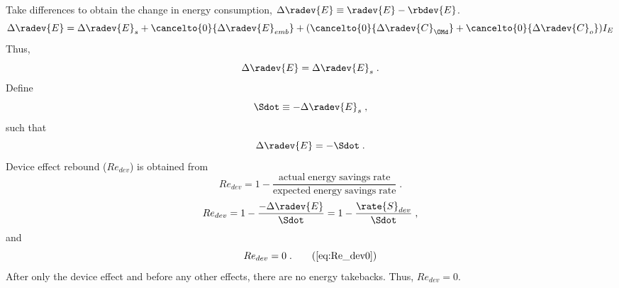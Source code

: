 \begin{landscape}
{Take differences to obtain the change in energy consumption, $\Delta \radev{E} \equiv \radev{E} - \rbdev{E}$.
%
\begin{equation}
  \Delta \radev{E} = \Delta \radev{E}_s
                     + \cancelto{0}{\Delta \radev{E}_{emb}} 
                     + (\cancelto{0}{\Delta \radev{C}_{\OMd}} 
                     + \cancelto{0}{\Delta \radev{C}_o}) I_E
\end{equation}
%
Thus, 
%
\begin{equation}
\Delta \radev{E} = \Delta \radev{E}_s \; .
\end{equation}
%
Define
%
\begin{equation} \label{eq:Sdot_def}
\Sdot \equiv -\Delta \radev{E}_s \; ,
\end{equation}
%
such that
%
\begin{equation}
\Delta \radev{E} = -\Sdot \; .
\end{equation}
%
Device effect rebound ($Re_{dev}$) is obtained from 
%
\begin{equation}
Re_{dev} = 1 - \frac{\mathrm{actual \; energy \; savings \; rate}}{\mathrm{expected \; energy \; savings \; rate}} \; .
\end{equation}
%
\begin{equation}
Re_{dev} = 1 - \frac{-\Delta \radev{E}}{\Sdot} = 1 - \frac{\rate{S}_{dev}}{\Sdot} \; ,
\end{equation}
%
and
%
\begin{equation}
Re_{dev} = 0 \; . \tag{\ref{eq:Re_dev0}}
\end{equation}
%
After only the device effect and before any other effects, 
there are no energy takebacks. 
Thus, $Re_{dev} = 0$.
%
}
{
~
    
}
\end{landscape}
